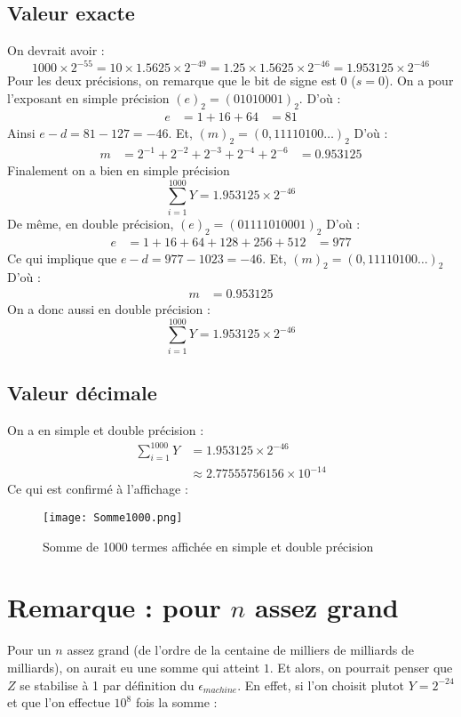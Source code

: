 \documentclass[a4paper, titlepage]{livret} %
\begin{document}
			\subsection{Valeur exacte}
				On devrait avoir :
				\[
					1000\times2^{-55} = 10\times1.5625\times2^{-49} = 1.25\times1.5625\times2^{-46} = 1.953125\times2^{-46}
				\]
				Pour les deux précisions, on remarque que le bit de signe est $0$ ($s = 0$).
				On a pour l'exposant en simple précision $(e)_{2} = (01010001)_{2}$.
				D'où :
				\[\begin{aligned}
					e & = 1 + 16 + 64
					  & = 81
				\end{aligned}\]
				Ainsi $e - d = 81 - 127 = -46$.
				Et, $(m)_{2} = (0,11110100…)_{2}$
				D'où :
				\[\begin{aligned}
					m & = 2^{-1} + 2^{-2} + 2^{-3} + 2^{-4} + 2^{-6}
					  & = 0.953125
				\end{aligned}\]
				Finalement on a bien en simple précision
				\[
					\sum_{i=1}^{1000} Y = 1.953125\times2^{-46}
				\]
				De même, en double précision, $(e)_{2} = (01111010001)_{2}$
				D'où :
				\[\begin{aligned}
					e & = 1 + 16 + 64 + 128 + 256 + 512
					  & = 977
				\end{aligned}\]
				Ce qui implique que $e - d = 977 - 1023 = -46$.
				Et, $(m)_{2} = (0,11110100…)_{2}$
				D'où :
				\[\begin{aligned}
					m & = 0.953125
				\end{aligned}\]
				On a donc aussi en double précision :
				\[
					\sum_{i=1}^{1000} Y = 1.953125\times2^{-46}
				\]

			\subsection{Valeur décimale}
				On a en simple et double précision :
				\[\begin{aligned}
				  \sum_{i=1}^{1000} Y & = 1.953125\times2^{-46}\\
									  & \approx 2.77555756156\times10^{-14}
				\end{aligned}\]
				Ce qui est confirmé à l'affichage :
				\begin{figure}[!h]
					\centering
  						\texttt{[image: Somme1000.png]}
  						\caption{Somme de 1000 termes affichée en simple et double précision}
				\end{figure}

		\section{Remarque : pour $n$ assez grand}
			Pour un $n$ assez grand (de l'ordre de la centaine de milliers de milliards de milliards), on aurait eu une somme qui atteint $1$.
			Et alors, on pourrait penser que $Z$ se stabilise à 1 par définition du $\epsilon_{machine}$.
			En effet, si l'on choisit plutot $Y = 2^{-24}$ et que l'on effectue $10^8$ fois la somme :
			
\end{document}
